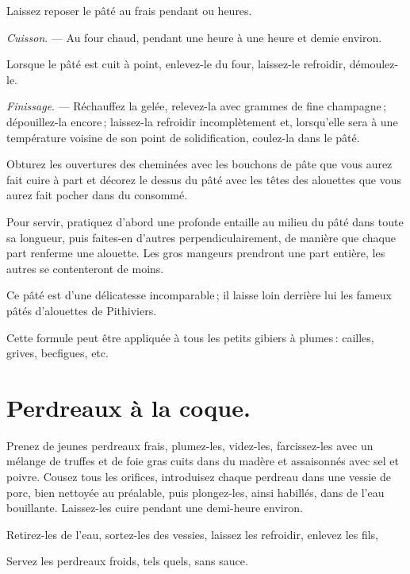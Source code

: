 Laissez reposer le pâté au frais pendant {\mmm} ou {\mmm} heures.

\medskip

\textit{Cuisson}. — Au four chaud, pendant une heure à une heure et demie
environ.

Lorsque le pâté est cuit à point, enlevez-le du four, laissez-le refroidir,
démoulez-le.

\medskip

\textit{Finissage}. — Réchauffez la gelée, relevez-la avec {\mmm} grammes
de fine champagne ; dépouillez-la encore ; laissez-la refroidir incomplètement
et, lorsqu'elle sera à une température voisine de son point de solidification,
coulez-la dans le pâté.

Obturez les ouvertures des cheminées avec les bouchons de pâte que vous aurez
fait cuire à part et décorez le dessus du pâté avec les têtes des alouettes que
vous aurez fait pocher dans du consommé.

Pour servir, pratiquez d'abord une profonde entaille au milieu du pâté dans
toute sa longueur, puis faites-en d'autres perpendiculairement, de manière que
chaque part renferme une alouette. Les gros mangeurs prendront une part
entière, les autres se contenteront de moins.

Ce pâté est d'une délicatesse incomparable ; il laisse loin derrière lui les
fameux pâtés d'alouettes de Pithiviers.

\sk

Cette formule peut être appliquée à tous les petits gibiers à plumes : cailles,
grives, becfigues, etc.

\section*{\centering Perdreaux à la coque.}
{}

Prenez de jeunes perdreaux frais, plumez-les, videz-les, farcissez-les avec un
mélange de truffes et de foie gras cuits dans du madère et assaisonnés avec sel
et poivre. Cousez tous les orifices, introduisez chaque perdreau dans une
vessie de porc, bien nettoyée au préalable, puis plongez-les, ainsi habillés,
dans de l'eau bouillante. Laissez-les cuire pendant une demi-heure environ.

Retirez-les de l'eau, sortez-les des vessies, laissez les refroidir, enlevez
les fils,

Servez les perdreaux froids, tels quels, sans sauce.

